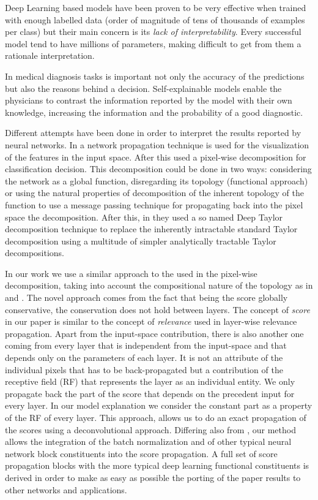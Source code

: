 \documentclass[preprint]{elsarticle}
\theoremstyle{definition} %
\theoremstyle{remark}
\begin{document}
Deep Learning based models have been proven to be very effective when trained with enough labelled data (order of magnitude of tens of thousands of examples per class) but their main concern is its \emph{lack of interpretability}. Every successful model tend to have millions of parameters, making difficult to get from them a rationale interpretation. 

In medical diagnosis tasks is important not only the accuracy of the predictions but also the reasons behind a decision. Self-explainable models enable the physicians to contrast the information reported by the model with their own knowledge, increasing the information and the probability of a good diagnostic.  

Different attempts have been done in order to interpret the results reported by neural networks. In \cite{zeiler2014visualizing} a network propagation technique is used for the visualization of the features in the input space. After this \cite{bach2015pixel} used a pixel-wise decomposition for classification decision. This decomposition could be done in two ways: considering the network as a global function, disregarding its topology (functional approach) or using the natural properties of decomposition of the inherent topology of the function to use a message passing technique for propagating back into the pixel space the decomposition. After this, in \cite{montavon2017explaining} they used a so named Deep Taylor decomposition technique to replace the inherently intractable standard Taylor decomposition using a multitude of simpler analytically tractable Taylor decompositions.

In our work we use a similar approach to the used in the pixel-wise decomposition, taking into account the compositional nature of the topology as in \cite{zeiler2014visualizing} and \cite{bach2015pixel}. The novel approach comes from the fact that being the score globally conservative, the conservation does not hold between layers. The concept of \emph{score} in our paper is similar to the concept of \emph{relevance} used in layer-wise relevance propagation. Apart from the input-space contribution, there is also another one coming from every layer that is independent from the input-space and that depends only on the parameters of each layer. It is not an attribute of the individual pixels that has to be back-propagated but a contribution of the receptive field (RF) that represents the layer as an individual entity. We only propagate back the part of the score that depends on the precedent input for every layer. In our model explanation we consider the constant part as a property of the RF of every layer. This approach, allows us to do an exact propagation of the scores using a deconvolutional approach. Differing also from \cite{zeiler2014visualizing}, our method allows the integration of the batch normalization and of other typical neural network block constituents into the score propagation. A full set of score propagation blocks with the more typical deep learning functional constituents is derived in order to make as easy as possible the porting of the paper results to other networks and applications.
\end{document}
